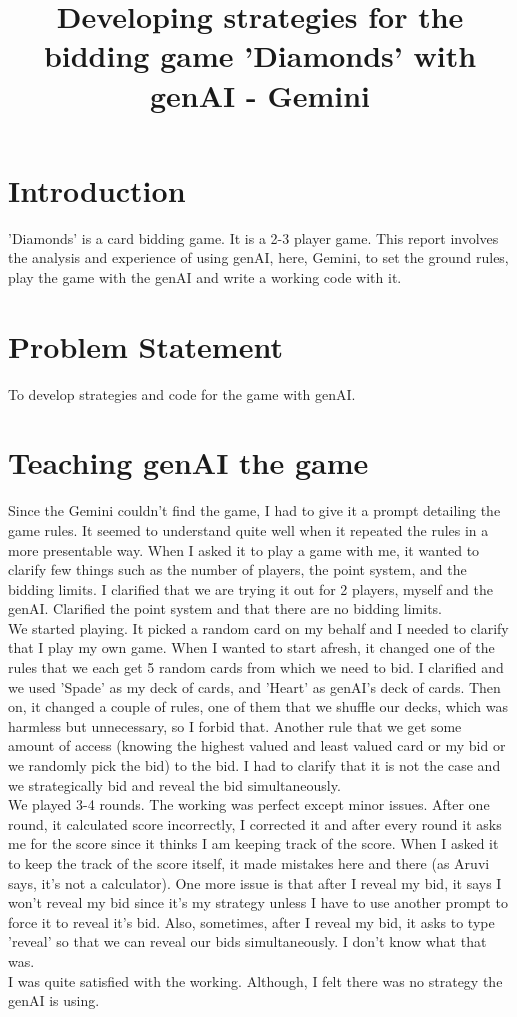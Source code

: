 \documentclass[a4paper,11pt,AutoFakeBold]{ctexart}
\title{\textbf{Developing strategies for the bidding game 'Diamonds' with genAI - Gemini}}
\date{}
\begin{document}
\maketitle



\section{Introduction}
'Diamonds' is a card bidding game. It is a 2-3 player game. This report involves the analysis and experience of using genAI, here, Gemini, to set the ground rules, play the game with the genAI and write a working code with it.

\section{Problem Statement}
To develop strategies and code for the game with genAI.

\section{Teaching genAI the game}
Since the Gemini couldn't find the game, I had to give it a prompt detailing the game rules. It seemed to understand quite well when it repeated the rules in a more presentable way. When I asked it to play a game with me, it wanted to clarify few things such as the number of players, the point system, and the bidding limits. I clarified that we are trying it out for 2 players, myself and the genAI. Clarified the point system and that there are no bidding limits. \\
We started playing. It picked a random card on my behalf and I needed to clarify that I play my own game. When I wanted to start afresh, it changed one of the rules that we each get 5 random cards from which we need to bid. I clarified and we used 'Spade' as my deck of cards, and 'Heart' as genAI's deck of cards. Then on, it changed a couple of rules, one of them that we shuffle our decks, which was harmless but unnecessary, so I forbid that. Another rule that we get some amount of access (knowing the highest valued and least valued card or my bid or we randomly pick the bid) to the bid. I had to clarify that it is not the case and we strategically bid and reveal the bid simultaneously. \\
We played 3-4 rounds. The working was perfect except minor issues. After one round, it calculated score incorrectly, I corrected it and after every round it asks me for the score since it thinks I am keeping track of the score. When I asked it to keep the track of the score itself, it made mistakes here and there (as Aruvi says, it's not a calculator).
One more issue is that after I reveal my bid, it says I won't reveal my bid since it's my strategy unless I have to use another prompt to force it to reveal it's bid. Also, sometimes, after I reveal my bid, it asks to type 'reveal' so that we can reveal our bids simultaneously. I don't know what that was. \\
I was quite satisfied with the working. Although, I felt there was no strategy the genAI is using.
\end{document}
